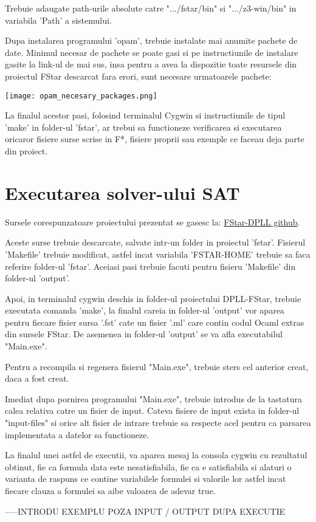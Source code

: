 Trebuie adaugate path-urile absolute catre ".../fstar/bin" si ".../z3-win/bin" in variabila 'Path' a sistemului.

Dupa instalarea programului 'opam', trebuie instalate mai anumite pachete de date. Minimul necesar de pachete se poate gasi si pe instructiunile de instalare gasite la link-ul de mai sus, insa pentru a avea la dispozitie toate resursele din proiectul FStar descarcat fara erori, sunt necesare urmatoarele pachete: 
\newline

\texttt{[image: opam\_necesary\_packages.png]}
\newline

La finalul acestor pasi, folosind terminalul Cygwin si instructiunile de tipul 'make' in folder-ul 'fstar', ar trebui sa functioneze verificarea si executarea oricaror fisiere surse scrise in F*, fisiere proprii sau exemple ce faceau deja parte din proiect.

\newpage

\section{Executarea solver-ului SAT}

Sursele corespunzatoare proiectului prezentat se gasesc la:
\href{https://github.com/alex4482/FStar-DPLL-licenta/tree/main/dpll_optimized}{FStar-DPLL github}.

Aceste surse trebuie descarcate, salvate intr-un folder in proiectul 'fstar'. Fisierul 'Makefile' trebuie modificat, astfel incat variabila 'FSTAR-HOME' trebuie sa faca referire folder-ul 'fstar'. Aceiasi pasi trebuie facuti pentru fisieru 'Makefile' din folder-ul 'output'.

Apoi, in terminalul cygwin deschis in folder-ul proiectului DPLL-FStar, trebuie executata comanda 'make', la finalul careia in folder-ul 'output' vor aparea pentru fiecare fisier sursa '.fst' cate un fisier '.ml' care contin codul Ocaml extras din sursele FStar. De asemenea in folder-ul 'output' se va afla executabilul "Main.exe".

Pentru a recompila si regenera fisierul "Main.exe", trebuie sters cel anterior creat, daca a fost creat.

Imediat dupa pornirea programului "Main.exe", trebuie introdus de la tastatura calea relativa catre un fisier de input. Cateva fisiere de input exista in folder-ul "input-files" si orice alt fisier de intrare trebuie sa respecte acel pentru ca parsarea implementata a datelor sa functioneze.

La finalul unei astfel de executii, va aparea mesaj la consola cygwin cu rezultatul obtinut, fie ca formula data este nesatisfiabila, fie ca e satisfiabila si alaturi o varianta de raspuns ce contine variabilele formulei si valorile lor astfel incat fiecare clauza a formulei sa aibe valoarea de adevar true.

-----INTRODU EXEMPLU POZA INPUT / OUTPUT DUPA EXECUTIE
